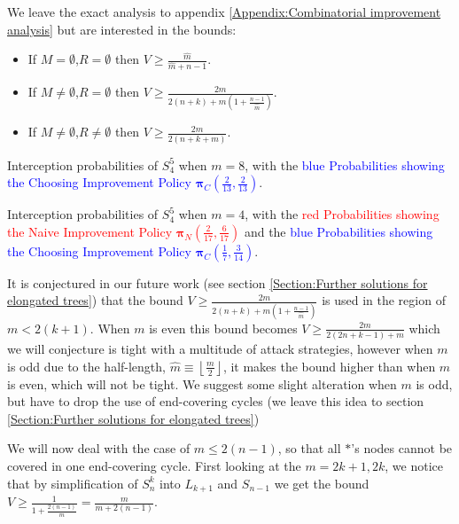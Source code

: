 \documentclass[a4paper,10pt]{article}
\newcommand{\floor}[1]{\left \lfloor #1 \right \rfloor}
\theoremstyle{definition}
\theoremstyle{definition}
\theoremstyle{remark}
\theoremstyle{definition}
\begin{document}
We leave the exact analysis to appendix \ref{Appendix:Combinatorial improvement analysis} but are interested in the bounds: 
\begin{itemize}
\item If $M=\emptyset$,$R=\emptyset$ then $V \geq \frac{\hat{m}}{\hat{m}+n-1}$.
\item If $M \neq \emptyset$,$R=\emptyset$ then $V \geq \frac{2m}{2(n+k)+m(1+\frac{n-1}{\hat{m}})}$.
\item If $M \neq \emptyset$,$R \neq \emptyset$ then $V \geq \frac{2m}{2(n+k+m)}$.
\end{itemize}

\begin{myfigure}
\begin{center}

\end{center}
\caption{Interception probabilities of $S^5_{4}$ when $m=8$, with the \textcolor{blue}{blue Probabilities showing the Choosing Improvement Policy $\bm{\pi}_{C} \left(\frac{2}{13},\frac{2}{13} \right)$}.}
\end{myfigure}

\begin{myfigure}
\begin{center}

\end{center}
\caption{Interception probabilities of $S^5_{4}$ when $m=4$, with the \textcolor{red}{red Probabilities showing the Naive Improvement Policy $\bm{\pi}_{N} \left(\frac{2}{17},\frac{6}{17} \right)$} and the \textcolor{blue}{blue Probabilities showing the Choosing Improvement Policy $\bm{\pi}_{C} \left(\frac{1}{7},\frac{3}{14} \right)$}.}
\end{myfigure}

It is conjectured in our future work (see section \ref{Section:Further solutions for elongated trees}) that the bound $V \geq \frac{2m}{2(n+k)+m(1+\frac{n-1}{\hat{m}})}$ is used in the region of $m < 2(k+1)$. When $m$ is even this bound becomes $V \geq \frac{2m}{2(2n+k-1)+m}$ which we will conjecture is tight with a multitude of attack strategies, however when $m$ is odd due to the half-length, $\hat{m} \equiv \floor{\frac{m}{2}}$, it makes the bound higher than when $m$ is even, which will not be tight. We suggest some slight alteration when $m$ is odd, but have to drop the use of end-covering cycles (we leave this idea to section \ref{Section:Further solutions for elongated trees})

We will now deal with the case of $m \leq 2(n-1)$, so that all $*$'s nodes cannot be covered in one end-covering cycle. First looking at the $m=2k+1,2k$,  we notice that by simplification of $S^{k}_{n}$ into $L_{k+1}$ and $S_{n-1}$ we get the bound $V \geq \frac{1}{1+\frac{2(n-1)}{m}}=\frac{m}{m+2(n-1)}$.
\end{document}
